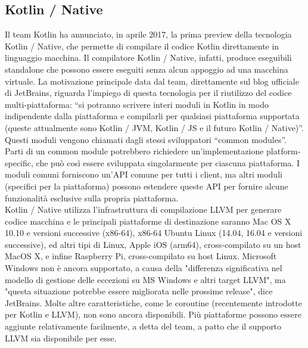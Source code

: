 \subsection{Kotlin / Native}
Il team Kotlin ha annunciato, in aprile 2017, la prima preview della tecnologia Kotlin / Native, che permette di compilare il codice Kotlin direttamente in linguaggio macchina. Il compilatore Kotlin / Native, infatti, produce eseguibili standalone che possono essere eseguiti senza alcun appoggio ad una macchina virtuale. La motivazione principale data dal team, direttamente sul blog ufficiale di JetBrains, riguarda l’impiego di questa tecnologia per il riutilizzo del codice multi-piattaforma: “si potranno scrivere interi moduli in Kotlin in modo indipendente dalla piattaforma e compilarli per qualsiasi piattaforma supportata (queste attualmente sono Kotlin / JVM, Kotlin / JS e il futuro Kotlin / Native)”. Questi moduli vengono chiamati dagli stessi sviluppatori “common modules”. Parti di un common module potrebbero richiedere un'implementazione platform-specific, che può così essere sviluppata singolarmente per ciascuna piattaforma. I moduli comuni forniscono un'API comune per tutti i client, ma altri moduli (specifici per la piattaforma) possono estendere queste API per fornire alcune funzionalità esclusive sulla propria piattaforma.\\
Kotlin / Native utilizza l'infrastruttura di compilazione LLVM per generare codice macchina e le principali piattaforme di destinazione saranno Mac OS X 10.10 e versioni successive (x86-64), x86-64 Ubuntu Linux (14.04, 16.04 e versioni successive), ed altri tipi di Linux, Apple iOS (arm64), cross-compilato su un host MacOS X, e infine Raspberry Pi, cross-compilato su host Linux. Microsoft Windows non è ancora supportato, a causa della "differenza significativa nel modello di gestione delle eccezioni su MS Windows e altri target LLVM", ma "questa situazione potrebbe essere migliorata nelle prossime release", dice JetBrains. Molte altre caratteristiche, come le coroutine (recentemente introdotte per Kotlin e LLVM), non sono ancora disponibili. Più piattaforme possono essere aggiunte relativamente facilmente, a detta del team, a patto che il supporto LLVM sia disponibile per esse.\\

